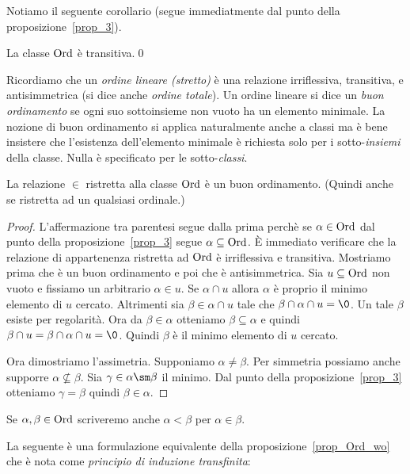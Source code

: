 Notiamo il seguente corollario (segue immediatmente dal punto  della proposizione~\ref{prop_3}).

\begin{corollary}
La classe ${\rm Ord}$ \`e transitiva.\hfill\qed
\end{corollary}


Ricordiamo che un \emph{ordine lineare (stretto)\/} \`e  una relazione irriflessiva, transitiva, e antisimmetrica (si dice anche \emph{ordine totale\/}). Un ordine lineare si dice un \emph{buon ordinamento\/} se ogni suo sottoinsieme non vuoto ha un elemento minimale. La nozione di buon ordinamento si applica naturalmente anche a classi ma \`e bene insistere che l'esistenza dell'elemento minimale \`e richiesta solo per i sotto-\textit{insiemi\/} della classe. Nulla \`e specificato per le sotto-\textit{classi}.   

\begin{proposition}\label{prop_Ord_wo}
La relazione $\in$ ristretta alla classe ${\rm Ord}$ \`e un buon ordinamento. (Quindi anche se ristretta ad un qualsiasi ordinale.)
\end{proposition}

\begin{proof}
L'affermazione tra parentesi segue dalla prima perch\`e se $\alpha\in{\rm Ord}$ dal punto  della proposizione~\ref{prop_3} segue $\alpha\subseteq{\rm Ord}$. \`E immediato verificare che la relazione di appartenenza ristretta ad ${\rm Ord}$ \`e irriflessiva e transitiva. Mostriamo prima che \`e un buon ordinamento e poi che \`e antisimmetrica. Sia $u\subseteq{\rm Ord}$ non vuoto e fissiamo un arbitrario $\alpha\in u$. Se $\alpha\cap u$ allora $\alpha$ \`e proprio il minimo elemento di $u$ cercato. Altrimenti sia $\beta\in\alpha\cap u$ tale che  $\beta\cap\alpha\cap u=\0$. Un tale $\beta$ esiste per regolarit\`a. Ora da $\beta\in\alpha$ otteniamo $\beta\subseteq\alpha$ e quindi $\beta\cap u=\beta\cap\alpha\cap u=\0$. Quindi $\beta$ \`e il minimo elemento di $u$ cercato.  

Ora dimostriamo l'assimetria. Supponiamo $\alpha\neq\beta$. Per simmetria possiamo anche supporre $\alpha\not\subseteq\beta$. Sia $\gamma\in\alpha\sm\beta$ il minimo. Dal punto   della proposizione~\ref{prop_3} otteniamo $\gamma=\beta$ quindi $\beta\in\alpha$. 
\end{proof}

Se $\alpha,\beta\in{\rm Ord}$ scriveremo anche \emph{$\alpha<\beta$\/} per $\alpha\in\beta$.

La seguente \`e una formulazione equivalente della proposizione~\ref{prop_Ord_wo} che \`e nota come \emph{principio di induzione transfinita}:

